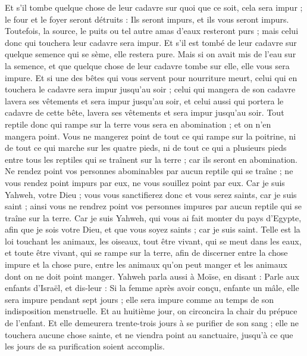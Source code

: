 \begin{multicols}{2}
Et s'il tombe quelque chose de leur cadavre sur quoi que ce soit, cela sera impur ; le four et le foyer seront détruits : Ils seront impurs, et ils vous seront impurs.
Toutefois, la source, le puits ou tel autre amas d'eaux resteront purs ; mais celui donc qui touchera leur cadavre sera impur.
Et s'il est tombé de leur cadavre sur quelque semence qui se sème, elle restera pure.
Mais si on avait mis de l'eau sur la semence, et que quelque chose de leur cadavre tombe sur elle, elle vous sera impure.
Et si une des bêtes qui vous servent pour nourriture meurt, celui qui en touchera le cadavre sera impur jusqu'au soir ;
celui qui mangera de son cadavre lavera ses vêtements et sera impur jusqu'au soir, et celui aussi qui portera le cadavre de cette bête, lavera ses vêtements et sera impur jusqu'au soir.
Tout reptile donc qui rampe sur la terre vous sera en abomination ; et on n'en mangera point.
Vous ne mangerez point de tout ce qui rampe sur la poitrine, ni de tout ce qui marche sur les quatre pieds, ni de tout ce qui a plusieurs pieds entre tous les reptiles qui se traînent sur la terre ; car ils seront en abomination.
Ne rendez point vos personnes abominables par aucun reptile qui se traîne ; ne vous rendez point impurs par eux, ne vous souillez point par eux.
Car je suis Yahweh, votre Dieu ; vous vous sanctifierez donc et vous serez saints, car je suis saint ; ainsi vous ne rendrez point vos personnes impures par aucun reptile qui se traîne sur la terre.
Car je suis Yahweh, qui vous ai fait monter du pays d'Egypte, afin que je sois votre Dieu, et que vous soyez saints ; car je suis saint.
Telle est la loi touchant les animaux, les oiseaux, tout être vivant, qui se meut dans les eaux, et toute être vivant, qui se rampe sur la terre,
afin de discerner entre la chose impure et la chose pure, entre les animaux qu'on peut manger et les animaux dont on ne doit point manger.
\VerseOne{}Yahweh parla aussi à Moïse, en disant :
Parle aux enfants d'Israël, et dis-leur : Si la femme après avoir conçu, enfante un mâle, elle sera impure pendant sept jours ; elle sera impure comme au temps de son indisposition menstruelle.
Et au huitième jour, on circoncira la chair du prépuce de l'enfant.
Et elle demeurera trente-trois jours à se purifier de son sang ; elle ne touchera aucune chose sainte, et ne viendra point au sanctuaire, jusqu'à ce que les jours de sa purification soient accomplis.

\end{multicols}
